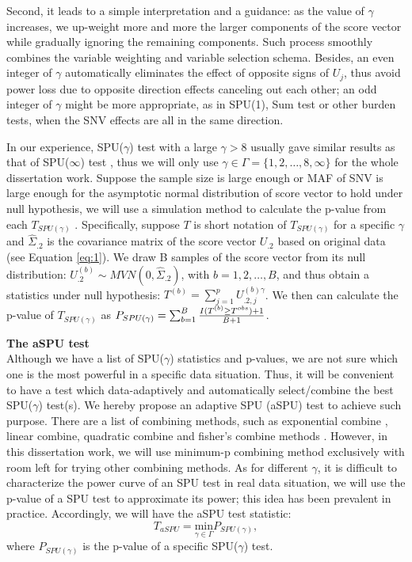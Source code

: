 \documentclass[12pt]{article}
\begin{document}
Second, it leads to a simple interpretation and a guidance: as the value of $\gamma$ increases, we up-weight more and more the larger components of the score vector while gradually ignoring the remaining components. Such process smoothly combines the variable weighting and variable selection schema. Besides, an even integer of $\gamma$ automatically eliminates the effect of opposite signs of $U_j$, thus avoid power loss due to opposite direction effects canceling out each other; an odd integer of $\gamma$ might be more appropriate, as in SPU(1), Sum test or other burden tests, when the SNV effects are all in the same direction.

In our experience, SPU($\gamma$) test with a large $\gamma > 8$ usually gave similar results as that of SPU($\infty$) test \cite{pan2014powerful}, thus we will only use $\gamma \in \Gamma = \{1,2,\ldots,8,\infty \} $ for the whole dissertation work. Suppose the sample size is large enough or MAF of SNV is large enough for the asymptotic normal distribution of score vector to hold under null hypothesis, we will use a simulation method to calculate the p-value from each $T_{ SPU(\gamma) }$ \cite{Lin2005,Seaman2005}. Specifically, suppose $T$ is short notation of $T_{ SPU(\gamma) }$ for a specific $\gamma$ and $\hat{\Sigma}_{.2}$ is the covariance matrix of the score vector $U_{.2}$ based on original data (see Equation \ref{eq:1}). We draw B samples of the score vector from its null distribution: $U_{.2}^{ (b) } \sim MVN \left( 0, \hat{\Sigma}_{.2} \right)$, with $b = 1,2,\ldots,B$, and thus obtain a statistics under null hypothesis: $T ^ {(b)} = \sum_{j=1}^p U^{ (b)\gamma }_{.2, j} $. We then can calculate the p-value of $T_{ SPU(\gamma) }$ as $P_{ SPU(\gamma) } = \sum_{b=1}^B { I(T^{(b)} \geq T ^ {obs} ) + 1  \over B + 1 } $. 

\textbf{The aSPU test}\\
Although we have a list of SPU($\gamma$) statistics and p-values, we are not sure which one is the most powerful in a specific data situation. Thus, it will be convenient to have a test which data-adaptively and automatically select/combine the best SPU($\gamma$) test(s). We hereby propose an adaptive SPU (aSPU) test to achieve such purpose. There are a list of combining methods, such as exponential combine \cite{Chen2012}, linear combine, quadratic combine and fisher's combine methods \cite{Luo2010,peng2009gene,Derkach2013}. However, in this dissertation work, we will use minimum-p combining method exclusively with room left for trying other combining methods. As for different $\gamma$, it is difficult to characterize the power curve of an SPU test in real data situation, we will use the p-value of a SPU test to approximate its power; this idea has been prevalent in practice. Accordingly, we will have the aSPU test statistic:
$$
T_{aSPU} = \underset{\gamma\in\Gamma}{ \textrm{min} } P_{ SPU(\gamma) },
$$
where $P_{ SPU(\gamma) }$ is the p-value of a specific SPU($\gamma$) test.
\end{document}
